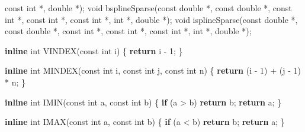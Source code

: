 \documentclass[
  12pt,
]{article}
\newenvironment{Shaded}{\begin{snugshade}}{\end{snugshade}}
\newcommand{\ControlFlowTok}[1]{\textcolor[rgb]{0.13,0.29,0.53}{\textbf{#1}}}
\newcommand{\DataTypeTok}[1]{\textcolor[rgb]{0.13,0.29,0.53}{#1}}
\newcommand{\DecValTok}[1]{\textcolor[rgb]{0.00,0.00,0.81}{#1}}
\newcommand{\KeywordTok}[1]{\textcolor[rgb]{0.13,0.29,0.53}{\textbf{#1}}}
\newcommand{\NormalTok}[1]{#1}
\begin{document}
\begin{Shaded}
\begin{Highlighting}[]
                  \DataTypeTok{const} \DataTypeTok{int}\NormalTok{ *, }\DataTypeTok{double}\NormalTok{ *);}
\DataTypeTok{void}\NormalTok{ bsplineSparse(}\DataTypeTok{const} \DataTypeTok{double}\NormalTok{ *, }\DataTypeTok{const} \DataTypeTok{double}\NormalTok{ *, }\DataTypeTok{const} \DataTypeTok{int}\NormalTok{ *, }\DataTypeTok{const} \DataTypeTok{int}\NormalTok{ *,}
                   \DataTypeTok{const} \DataTypeTok{int}\NormalTok{ *, }\DataTypeTok{int}\NormalTok{ *, }\DataTypeTok{double}\NormalTok{ *);}
\DataTypeTok{void}\NormalTok{ isplineSparse(}\DataTypeTok{const} \DataTypeTok{double}\NormalTok{ *, }\DataTypeTok{const} \DataTypeTok{double}\NormalTok{ *, }\DataTypeTok{const} \DataTypeTok{int}\NormalTok{ *, }\DataTypeTok{const} \DataTypeTok{int}\NormalTok{ *,}
                   \DataTypeTok{const} \DataTypeTok{int}\NormalTok{ *, }\DataTypeTok{int}\NormalTok{ *, }\DataTypeTok{double}\NormalTok{ *);}

\KeywordTok{inline} \DataTypeTok{int}\NormalTok{ VINDEX(}\DataTypeTok{const} \DataTypeTok{int}\NormalTok{ i) \{ }\ControlFlowTok{return}\NormalTok{ i {-} }\DecValTok{1}\NormalTok{; \}}

\KeywordTok{inline} \DataTypeTok{int}\NormalTok{ MINDEX(}\DataTypeTok{const} \DataTypeTok{int}\NormalTok{ i, }\DataTypeTok{const} \DataTypeTok{int}\NormalTok{ j, }\DataTypeTok{const} \DataTypeTok{int}\NormalTok{ n) \{}
    \ControlFlowTok{return}\NormalTok{ (i {-} }\DecValTok{1}\NormalTok{) + (j {-} }\DecValTok{1}\NormalTok{) * n;}
\NormalTok{\}}

\KeywordTok{inline} \DataTypeTok{int}\NormalTok{ IMIN(}\DataTypeTok{const} \DataTypeTok{int}\NormalTok{ a, }\DataTypeTok{const} \DataTypeTok{int}\NormalTok{ b) \{}
    \ControlFlowTok{if}\NormalTok{ (a \textgreater{} b) }\ControlFlowTok{return}\NormalTok{ b;}
    \ControlFlowTok{return}\NormalTok{ a;}
\NormalTok{\}}

\KeywordTok{inline} \DataTypeTok{int}\NormalTok{ IMAX(}\DataTypeTok{const} \DataTypeTok{int}\NormalTok{ a, }\DataTypeTok{const} \DataTypeTok{int}\NormalTok{ b) \{}
    \ControlFlowTok{if}\NormalTok{ (a \textless{} b) }\ControlFlowTok{return}\NormalTok{ b;}
    \ControlFlowTok{return}\NormalTok{ a;}
\NormalTok{\}}


\end{Highlighting}
\end{Shaded}
\end{document}
